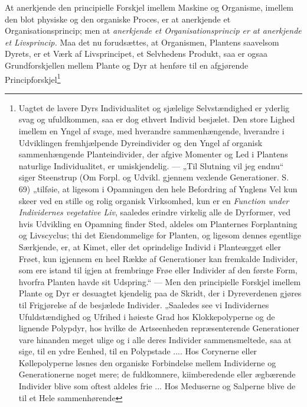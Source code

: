 \documentclass[12pt,a4paper]{book}
\begin{document}
At anerkjende den principielle Forskjel imellem Maskine og Organisme,
imellem den blot physiske og den organiske
\setcounter{footnote}{0}
Proces, er at anerkjende et Organisationsprincip; men at
\emph{anerkjende et Organisationsprincip er at anerkjende et
Livsprincip.} Maa det nu forudsættes, at Organismen, Plantens saavelsom
Dyrets, er et Værk af Livsprincipet, et Selvhedens Produkt, saa er ogsaa
Grundforskjellen mellem Plante og Dyr at henføre til en afgjørende
Principforskjel\footnote{Uagtet de lavere Dyrs Individualitet og
sjælelige Selvstændighed er yderlig svag og ufuldkommen, saa er dog
ethvert Individ besjælet. Den store Lighed imellem en Yngel af svage, med
hverandre sammenhængende, hverandre i Udviklingen fremhjælpende
Dyreindivider og den Yngel af organisk sammenhængende Planteindivider,
der afgive Momenter og Led i Plantens naturlige Individualitet, er
umiskjendelig. --- „Til Slutning vil jeg endnu“ siger Steenstrup (Om
Forpl. og Udvikl. gjennem vexlende Generationer. S. 69) „tilføie, at
ligesom i Opamningen den hele Befordring af Ynglens Vel kun skeer ved en
stille og rolig organisk Virksomhed, kun er en \emph{Function under
Individernes vegetative Liv}, saaledes erindre virkelig alle de
Dyrformer, ved hvis Udvikling en Opamning finder Sted, aldeles om
Planternes Forplantning og Livscyclus; thi det Eiendommelige for Planten,
og ligesom dennes egentlige Særkjende, er, at Kimet, eller det
oprindelige Individ i Planteægget eller Frøet, kun igjennem en heel Række
af Generationer kan fremkalde Individer, som ere istand til igjen at
frembringe Frøe eller Individer af den første Form, hvorfra Planten havde
sit Udspring.“ --- Men den principielle Forskjel imellem Plante og Dyr er
desuagtet kjendelig paa de Skridt, der i Dyreverdenen gjøres til
Frigjørelse af de besjælede Individer. „Saaledes see vi Individernes
Ufuldstændighed og Ufrihed i høieste Grad hos Klokkepolyperne og de
lignende Polypdyr, hos hvilke de Artseenheden repræsenterende
Generationer vare hinanden meget ulige og i alle deres Individer
sammensmeltede, saa at sige, til en ydre Eenhed, til en Polypstade ....
Hos Corynerne eller Køllepolyperne løsnes den organiske Forbindelse
mellem Individerne og Generationerne noget mere; de fuldkomnere,
kiimberedende eller ægbærende Individer blive som oftest aldeles frie ...
Hos Meduserne og Salperne blive de til et Hele sammenhørende
}
\end{document}
